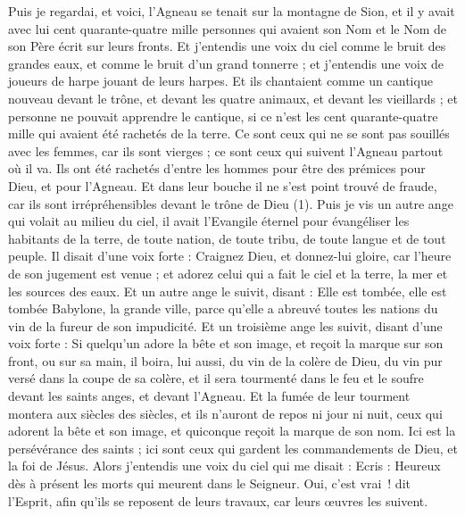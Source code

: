 \begin{multicols}{2}
\VerseOne{}Puis je regardai, et voici, l'Agneau se tenait sur la montagne de Sion, et il y avait avec lui cent quarante-quatre mille personnes qui avaient son Nom et le Nom de son Père écrit sur leurs fronts.
Et j'entendis une voix du ciel comme le bruit des grandes eaux, et comme le bruit d'un grand tonnerre ; et j'entendis une voix de joueurs de harpe jouant de leurs harpes.
Et ils chantaient comme un cantique nouveau devant le trône, et devant les quatre animaux, et devant les vieillards ; et personne ne pouvait apprendre le cantique, si ce n’est les cent quarante-quatre mille qui avaient été rachetés de la terre.
Ce sont ceux qui ne se sont pas souillés avec les femmes, car ils sont vierges ; ce sont ceux qui suivent l'Agneau partout où il va. Ils ont été rachetés d'entre les hommes pour être des prémices pour Dieu, et pour l'Agneau.
Et dans leur bouche il ne s’est point trouvé de fraude, car ils sont irrépréhensibles devant le trône de Dieu (1).
Puis je vis un autre ange qui volait au milieu du ciel, il avait l'Evangile éternel pour évangéliser les habitants de la terre, de toute nation, de toute tribu, de toute langue et de tout peuple.
Il disait d’une voix forte : Craignez Dieu, et donnez-lui gloire, car l'heure de son jugement est venue ; et adorez celui qui a fait le ciel et la terre, la mer et les sources des eaux.
Et un autre ange le suivit, disant : Elle est tombée, elle est tombée Babylone, la grande ville, parce qu'elle a abreuvé toutes les nations du vin de la fureur de son impudicité.
Et un troisième ange les suivit, disant d’une voix forte : Si quelqu'un adore la bête et son image, et reçoit la marque sur son front, ou sur sa main,
il boira, lui aussi, du vin de la colère de Dieu, du vin pur versé dans la coupe de sa colère, et il sera tourmenté dans le feu et le soufre devant les saints anges, et devant l'Agneau.
Et la fumée de leur tourment montera aux siècles des siècles, et ils n'auront de repos ni jour ni nuit, ceux qui adorent la bête et son image, et quiconque reçoit la marque de son nom.
Ici est la persévérance des saints ; ici sont ceux qui gardent les commandements de Dieu, et la foi de Jésus.
Alors j'entendis une voix du ciel qui me disait : Ecris : Heureux dès à présent les morts qui meurent dans le Seigneur. Oui, c’est vrai ! dit l'Esprit, afin qu’ils se reposent de leurs travaux, car leurs œuvres les suivent.

\end{multicols}
